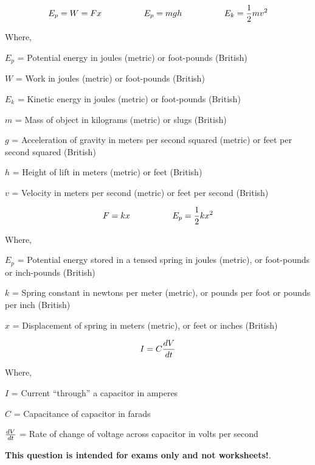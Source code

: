 

$$E_p = W = Fx   \hskip 50pt   E_p = mgh   \hskip 50pt   E_k = {1 \over 2} mv^2$$

\noindent
Where,

$E_p$ = Potential energy in joules (metric) or foot-pounds (British)

$W$ = Work in joules (metric) or foot-pounds (British)

$E_k$ = Kinetic energy in joules (metric) or foot-pounds (British)

$m$ = Mass of object in kilograms (metric) or slugs (British)

$g$ = Acceleration of gravity in meters per second squared (metric) or feet per second squared (British)

$h$ = Height of lift in meters (metric) or feet (British)

$v$ = Velocity in meters per second (metric) or feet per second (British)

\vskip 30pt

$$F = kx   \hskip 50pt   E_p = {1 \over 2}kx^2 $$

\noindent
Where,

$E_p$ = Potential energy stored in a tensed spring in joules (metric), or foot-pounds or inch-pounds (British)

$k$ = Spring constant in newtons per meter (metric), or pounds per foot or pounds per inch (British)

$x$ = Displacement of spring in meters (metric), or feet or inches (British)

\vskip 30pt

$$I = C {dV \over dt}$$

\noindent
Where,

$I$ = Current ``through'' a capacitor in amperes

$C$ = Capacitance of capacitor in farads

$dV \over dt$ = Rate of change of voltage across capacitor in volts per second

\vskip 30pt















{\bf This question is intended for exams only and not worksheets!}.



